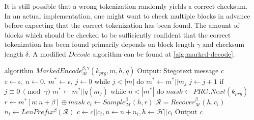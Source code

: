 It is still possible that a wrong tokenization randomly yields a correct checksum.
In an actual implementation, one might want to check multiple blocks in advance before expecting that the correct tokenization has been found.
The amount of blocks which should be checked to be sufficiently confident that the correct tokenization has been found primarily depends on block length $\gamma$ and checksum length $\delta$.
A modified $Decode$ algorithm can be found at \autoref{alg:marked-decode}.

\begin{Pseudocode}[caption={
Marked Encode Algorithm.
The modification this algorithm introduces is that after every $\gamma$ bits a checksum $q(m_i)$ is inserted into the hiddentext.
This allows the recipient to check for decoding errors due to wrong tokenization.
$q$ is a function which generates a checksum of fixed length $\delta$.
}, label={alg:marked-encode}]
algorithm $MarkedEncode_{\mathcal{M}}^{\beta, \gamma}(k_{prg}, m, h, q)$
	Output: Stegotext message $c$
	$c \leftarrow \epsilon,~ n \leftarrow 0,~ m^* \leftarrow \epsilon,~ j \leftarrow 0$
	while $j < |m|$ do
		$m^* \leftarrow m^* || m_j$
		$j \leftarrow j + 1$
		if $j \equiv 0~ \pmod \gamma$
			$m^* \leftarrow m^* || q(m_j)$
	while $n < |m^*|$ do
		$mask \leftarrow PRG.Next(k_{prg})$
		$r \leftarrow m^*[n:n+\beta] \oplus mask$
		$c_i \leftarrow Sample_{\mathcal{M}}^\beta(h, r)$
		$\mathcal{R} = Recover_{\mathcal{M}}^\beta(h, c_i)$
		$n_i \leftarrow LenPrefix^\beta(\mathcal{R})$
		$c \leftarrow c || c_i, n \leftarrow n+n_i, h \leftarrow \mathcal{H}||c_i$
	Output $c$
\end{Pseudocode}



